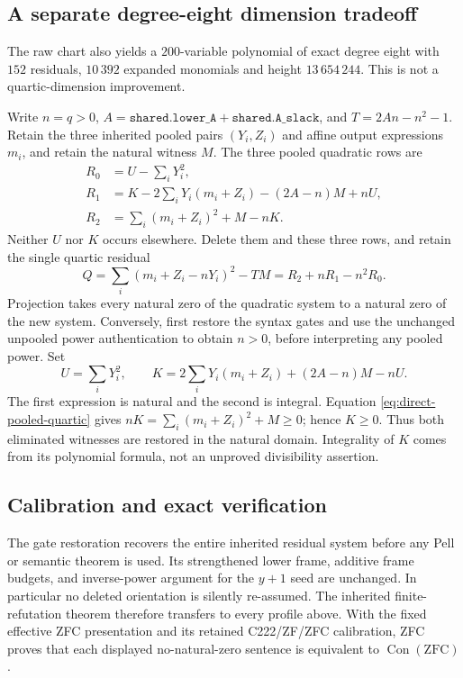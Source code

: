 \subsection{A separate degree-eight dimension tradeoff}

The raw chart also yields a $200$-variable polynomial of exact degree eight
with $152$ residuals, $10\,392$ expanded monomials and height
$13\,654\,244$.  This is not a quartic-dimension improvement.

Write $n=q>0$, $A=\texttt{shared.lower\_A}+\texttt{shared.A\_slack}$,
and $T=2An-n^2-1$.  Retain the three inherited pooled pairs $(Y_i,Z_i)$
and affine output expressions $m_i$, and retain the natural witness $M$.
The three pooled quadratic rows are
\begin{align*}
 R_0&=U-\sum_iY_i^2,\\
 R_1&=K-2\sum_iY_i(m_i+Z_i)-(2A-n)M+nU,\\
 R_2&=\sum_i(m_i+Z_i)^2+M-nK.
\end{align*}
Neither $U$ nor $K$ occurs elsewhere.  Delete them and these three rows,
and retain the single quartic residual
\begin{equation}
 Q=\sum_i(m_i+Z_i-nY_i)^2-TM
   =R_2+nR_1-n^2R_0.
 \label{eq:direct-pooled-quartic}
\end{equation}
Projection takes every natural zero of the quadratic system to a natural
zero of the new system.  Conversely, first restore the syntax gates and
use the unchanged unpooled power authentication to obtain $n>0$, before
interpreting any pooled power.  Set
\[
 U=\sum_iY_i^2,\qquad
 K=2\sum_iY_i(m_i+Z_i)+(2A-n)M-nU.
\]
The first expression is natural and the second is integral.  Equation
\eqref{eq:direct-pooled-quartic} gives
$nK=\sum_i(m_i+Z_i)^2+M\geq0$; hence $K\geq0$.  Thus both eliminated
witnesses are restored in the natural domain.  Integrality of $K$ comes
from its polynomial formula, not an unproved divisibility assertion.

\subsection{Calibration and exact verification}

The gate restoration recovers the entire inherited residual system before
any Pell or semantic theorem is used.  Its strengthened lower frame,
additive frame budgets, and inverse-power argument for the $y+1$ seed are
unchanged.  In particular no deleted orientation is silently re-assumed.
The inherited finite-refutation theorem therefore transfers to every
profile above.  With the fixed effective ZFC presentation and its retained
C222/ZF/ZFC calibration, ZFC proves that each displayed no-natural-zero
sentence is equivalent to $\operatorname{Con}(\mathrm{ZFC})$.


